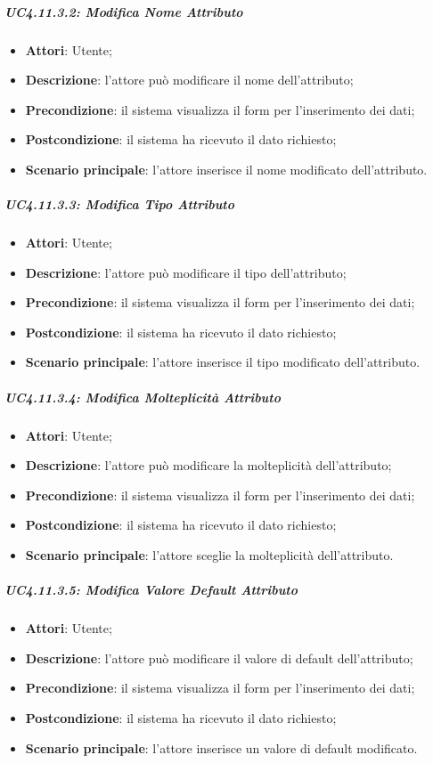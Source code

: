 \subparagraph{UC4.11.3.2: Modifica Nome Attributo}
\label{UC4.11.3.2}
\begin{itemize}
\item \textbf{Attori}: Utente;
\item \textbf{Descrizione}: l'attore può modificare il nome dell'attributo;	
\item \textbf{Precondizione}: il sistema visualizza il form per l'inserimento dei dati;	
\item \textbf{Postcondizione}: il sistema ha ricevuto il dato richiesto;	
\item \textbf{Scenario principale}:
l'attore inserisce il nome modificato dell'attributo.	
\end{itemize}

\subparagraph{UC4.11.3.3: Modifica Tipo Attributo}
\label{UC4.11.3.3}
\begin{itemize}
\item \textbf{Attori}: Utente;
\item \textbf{Descrizione}: l'attore può modificare il tipo dell'attributo;	
\item \textbf{Precondizione}: il sistema visualizza il form per l'inserimento dei dati;	
\item \textbf{Postcondizione}: il sistema ha ricevuto il dato richiesto;	
\item \textbf{Scenario principale}:
l'attore inserisce il tipo modificato dell'attributo.	
\end{itemize}

\subparagraph{UC4.11.3.4: Modifica Molteplicità Attributo}
\label{UC4.11.3.4}
\begin{itemize}
\item \textbf{Attori}: Utente;
\item \textbf{Descrizione}: l'attore può modificare la molteplicità dell'attributo;	
\item \textbf{Precondizione}: il sistema visualizza il form per l'inserimento dei dati;	
\item \textbf{Postcondizione}: il sistema ha ricevuto il dato richiesto;	
\item \textbf{Scenario principale}:
l'attore sceglie la molteplicità dell'attributo.
\end{itemize}

\subparagraph{UC4.11.3.5: Modifica Valore Default Attributo}
\label{UC4.11.3.5}
\begin{itemize}
\item \textbf{Attori}: Utente;
\item \textbf{Descrizione}: l'attore può modificare il valore di default dell'attributo;	
\item \textbf{Precondizione}: il sistema visualizza il form per l'inserimento dei dati;	
\item \textbf{Postcondizione}: il sistema ha ricevuto il dato richiesto;	
\item \textbf{Scenario principale}:
l'attore inserisce un valore di default modificato.	
\end{itemize}

